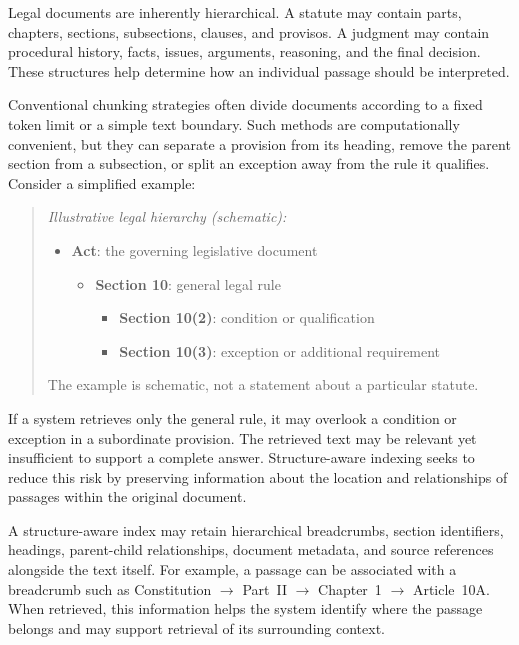 Legal documents are inherently hierarchical. A statute may contain parts, chapters, sections,
subsections, clauses, and provisos. A judgment may contain procedural history, facts, issues,
arguments, reasoning, and the final decision. These structures help determine how an individual
passage should be interpreted.

Conventional chunking strategies often divide documents according to a fixed token limit or a simple
text boundary. Such methods are computationally convenient, but they can separate a provision from its
heading, remove the parent section from a subsection, or split an exception away from the rule it
qualifies. Consider a simplified example:

\begin{quote}
\textit{Illustrative legal hierarchy (schematic):}
\begin{itemize}[leftmargin=1.3em, itemsep=1pt, topsep=2pt]
\item \textbf{Act}: the governing legislative document
  \begin{itemize}[leftmargin=1.2em, itemsep=1pt, topsep=1pt]
  \item \textbf{Section 10}: general legal rule
    \begin{itemize}[leftmargin=1.2em, itemsep=1pt, topsep=1pt]
    \item \textbf{Section 10(2)}: condition or qualification
    \item \textbf{Section 10(3)}: exception or additional requirement
    \end{itemize}
  \end{itemize}
\end{itemize}
The example is schematic, not a statement about a particular statute.
\end{quote}

If a system retrieves only the general rule, it may overlook a condition or exception in a subordinate
provision. The retrieved text may be relevant yet insufficient to support a complete answer.
Structure-aware indexing seeks to reduce this risk by preserving information about the location and
relationships of passages within the original document.

A structure-aware index may retain hierarchical breadcrumbs, section identifiers, headings,
parent-child relationships, document metadata, and source references alongside the text itself. For
example, a passage can be associated with a breadcrumb such as Constitution $\to$ Part~II $\to$
Chapter~1 $\to$ Article~10A. When retrieved, this information helps the system identify where the
passage belongs and may support retrieval of its surrounding context.

